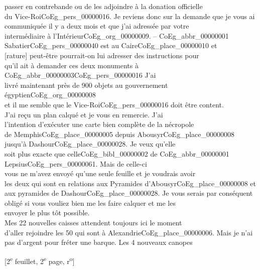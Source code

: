 \documentclass{book}
\begin{document}
passer en contrebande ou de les adjoindre à la donation officielle\\
du Vice-Roi\gls{CoEg_pers_00000016}. Je reviens donc sur la demande que je vous ai\\
communiquée il y a deux mois et que j’ai adressée par votre\\
intermédiaire à l’Intérieur\gls{CoEg_org_00000009}. – \gls{CoEg_abbr_00000001} Sabatier\gls{CoEg_pers_00000040} est au Caire\gls{CoEg_place_00000010} et\\
{[rature]} peut-être pourrait-on lui adresser des instructions pour\\
qu’il ait à demander ces deux monuments à \gls{CoEg_abbr_00000003}\gls{CoEg_pers_00000016} J’ai\\
livré maintenant près de 900 objets au gouvernement égyptien\gls{CoEg_org_00000008}\\
et il me semble que le Vice-Roi\gls{CoEg_pers_00000016} doit être content.\\
\indent J’ai reçu un plan calqué et je vous en remercie. J’ai\\
l’intention d’exécuter une carte bien complète de la nécropole\\
de Memphis\gls{CoEg_place_00000005} depuis Abousyr\gls{CoEg_place_00000008} jusqu’à Dashour\gls{CoEg_place_00000028}. Je veux qu’elle\\
soit plus exacte que celle\gls{CoEg_bibl_00000002} de \gls{CoEg_abbr_00000001} Lepsius\gls{CoEg_pers_00000061}. Mais de celle-ci\\
vous ne m’avez envoyé qu’une seule feuille et je voudrais avoir\\
les deux qui sont en relations aux Pyramides d’Abousyr\gls{CoEg_place_00000008} et\\
aux pyramides de Dashour\gls{CoEg_place_00000028}. Je vous serais par conséquent\\
obligé si vous vouliez bien me les faire calquer et me les\\
envoyer le plus tôt possible.\\
\indent Mes 22 nouvelles caisses attendent toujours ici le moment\\
d’aller rejoindre les 50 qui sont à Alexandrie\gls{CoEg_place_00000006}. Mais je n’ai\\
pas d’argent pour fréter une barque. Les 4 nouveaux canopes
{\footnotesize\begin{center} {[2\textsuperscript{e} feuillet, 2\textsuperscript{e} page, r\textsuperscript{o}]}\end{center}}
\end{document}
